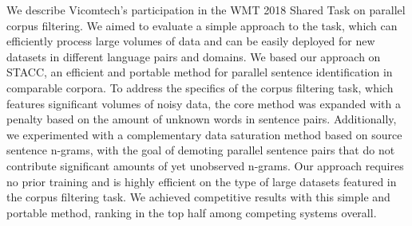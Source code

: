 We describe Vicomtech's participation in the WMT 2018 Shared Task on parallel corpus filtering. We aimed to evaluate a simple approach to the task, which can efficiently process large volumes of data and can be easily deployed for new datasets in different language pairs and domains. We based our approach on STACC, an efficient and portable method for parallel sentence identification in comparable corpora. To address the specifics of the corpus filtering task, which features significant volumes of noisy data, the core method was expanded with a penalty based on the amount of unknown words in sentence pairs. Additionally, we experimented with a complementary data saturation method based on source sentence n-grams, with the goal of demoting parallel sentence pairs that do not contribute significant amounts of yet unobserved n-grams. Our approach requires no prior training and is highly efficient on the type of large datasets featured in the corpus filtering task. We achieved competitive results with this simple and portable method, ranking in the top half among competing systems overall.
